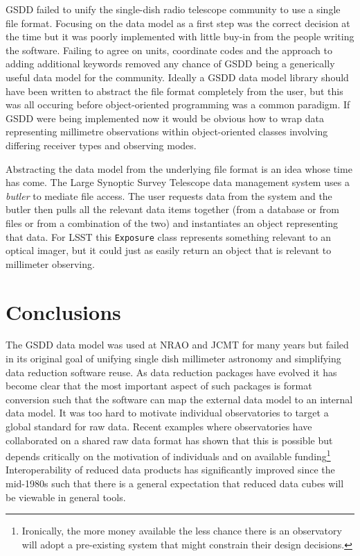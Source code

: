 \documentclass[final,authoryear,5p,times,twocolumn]{elsarticle}
\begin{document}
GSDD failed to unify the single-dish radio telescope community to use
a single file format. Focusing on the data model as a first step was
the correct decision at the time but it was poorly
implemented with little buy-in from the people writing the
software. Failing to agree on units, coordinate codes and the approach
to adding additional keywords removed any chance of GSDD being a
generically useful data model for the community.
Ideally a GSDD data model library should have been written to
abstract the file format completely from the user, but this was
all occuring before object-oriented programming was a common
paradigm. If GSDD were being implemented now it would be obvious how
to wrap data representing millimetre observations within object-oriented classes
involving differing receiver types and observing modes.

Abstracting the data model from the underlying file format is an idea
whose time has come. The Large Synoptic Survey Telescope data
management system \citep{2008arXiv0805.2366I,2010SPIE.7740E..1NK} uses
a \emph{butler} to mediate file access. The user requests data from
the system and the butler then pulls all the relevant data items
together (from a database or from files or from a combination of the
two) and instantiates an object representing that data. For LSST this
\texttt{Exposure} class represents something relevant to an optical
imager, but it could just as easily return an object that is relevant to
millimeter observing.

\section{Conclusions}

The GSDD data model was used at NRAO and JCMT for many years
but failed in its original goal of unifying single dish millimeter
astronomy and simplifying data reduction software reuse. As data
reduction packages have evolved it has become clear that the most
important aspect of such packages is format conversion such that the
software can map the external data model to an internal data model. It
was too hard to motivate individual observatories to target a
global standard for raw data. Recent examples where observatories have
collaborated on a shared raw data format
\citep[e.g. MBFITS;][]{2006A&A...454L..25M} has shown that this is
possible but depends critically on the motivation of individuals and
on available funding\footnote{Ironically, the more money available the
  less chance there is an observatory will adopt a pre-existing system
  that might constrain their design decisions.}
 Interoperability of reduced data
products has significantly improved since the mid-1980s such that
there is a general expectation that reduced data cubes will be
viewable in general tools.
\end{document}
